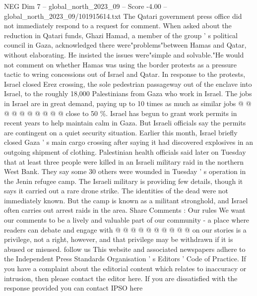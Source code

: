 \begin{textsample}{NEG Dim 7 – global\_north\_2023\_09 – Score -4.00 – global\_north\_2023\_09/101915614.txt}
The Qatari government press office did not immediately respond to a request for comment.
When asked about the reduction in Qatari funds, Ghazi Hamad, a member of the group ' s political council in Gaza, acknowledged there were"problems"between Hamas and Qatar, without elaborating.
He insisted the issues were"simple and solvable."He would not comment on whether Hamas was using the border protests as a pressure tactic to wring concessions out of Israel and Qatar.
In response to the protests, Israel closed Erez crossing, the sole pedestrian passageway out of the enclave into Israel, to the roughly 18,000 Palestinians from Gaza who work in Israel.
The jobs in Israel are in great demand, paying up to 10 times as much as similar jobs @ @ @ @ @ @ @ @ @ @ close to 50 \%.
Israel has begun to grant work permits in recent years to help maintain calm in Gaza.
But Israeli officials say the permits are contingent on a quiet security situation.
Earlier this month, Israel briefly closed Gaza ' s main cargo crossing after saying it had discovered explosives in an outgoing shipment of clothing.
Palestinian health officials said later on Tuesday that at least three people were killed in an Israeli military raid in the northern West Bank.
They say some 30 others were wounded in Tuesday ' s operation in the Jenin refugee camp.
The Israeli military is providing few details, though it says it carried out a rare drone strike.
The identities of the dead were not immediately known.
But the camp is known as a militant stronghold, and Israel often carries out arrest raids in the area.
Share Comments : Our rules We want our comments to be a lively and valuable part of our community - a place where readers can debate and engage with @ @ @ @ @ @ @ @ @ @ on our stories is a privilege, not a right, however, and that privilege may be withdrawn if it is abused or misused. follow us This website and associated newspapers adhere to the Independent Press Standards Organisation ' s Editors ' Code of Practice.
If you have a complaint about the editorial content which relates to inaccuracy or intrusion, then please contact the editor here.
If you are dissatisfied with the response provided you can contact IPSO here

\end{textsample}
